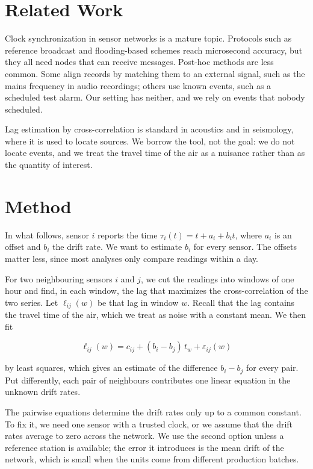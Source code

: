 \documentclass{article}
\begin{document}
\section{Related Work}

Clock synchronization in sensor networks is a mature topic. Protocols such
as reference broadcast \citep{elson2002fine} and flooding-based schemes
\citep{maroti2004flooding} reach microsecond accuracy, but they all need
nodes that can receive messages. Post-hoc methods are less common. Some
align records by matching them to an external signal, such as the mains
frequency in audio recordings; others use known events, such as a scheduled
test alarm. Our setting has neither, and we rely on events that nobody
scheduled.

Lag estimation by cross-correlation is standard in acoustics and in
seismology, where it is used to locate sources. We borrow the tool, not the
goal: we do not locate events, and we treat the travel time of the air as a
nuisance rather than as the quantity of interest.

\section{Method}

In what follows, sensor $i$ reports the time $\tau_i(t) = t + a_i + b_i t$,
where $a_i$ is an offset and $b_i$ the drift rate. We want to estimate $b_i$
for every sensor. The offsets matter less, since most analyses only compare
readings within a day.

For two neighbouring sensors $i$ and $j$, we cut the readings into windows
of one hour and find, in each window, the lag that maximizes the
cross-correlation of the two series. Let $\ell_{ij}(w)$ be that lag in
window $w$. Recall that the lag contains the travel time of the air, which
we treat as noise with a constant mean. We then fit

\begin{equation}
  \ell_{ij}(w) = c_{ij} + (b_i - b_j)\, t_w + \varepsilon_{ij}(w)
  \label{eq:lag}
\end{equation}

by least squares, which gives an estimate of the difference $b_i - b_j$ for
every pair. Put differently, each pair of neighbours contributes one linear
equation in the unknown drift rates.

The pairwise equations determine the drift rates only up to a common
constant. To fix it, we need one sensor with a trusted clock, or we assume
that the drift rates average to zero across the network. We use the second
option unless a reference station is available; the error it introduces is
the mean drift of the network, which is small when the units come from
different production batches.
\end{document}
